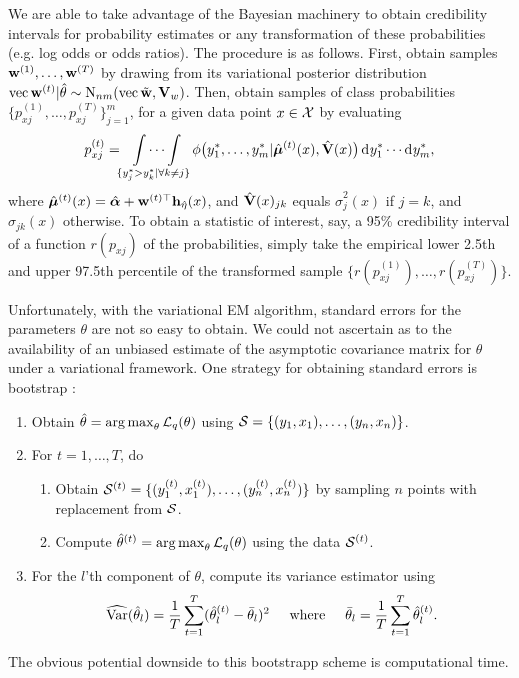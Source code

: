 We are able to take advantage of the Bayesian machinery to obtain credibility intervals for probability estimates or any transformation of these probabilities (e.g. log odds or odds ratios).
The procedure is as follows.
First, obtain samples ${\mathbf w}^{(1)},\dots,{\mathbf w}^{(T)}$ by drawing from its variational posterior distribution $\operatorname{vec}{\mathbf w}^{(t)}|\hat\theta \sim \operatorname{N}_{nm}(\operatorname{vec} \tilde{{\mathbf w}},{\mathbf V}_w)$.
Then, obtain samples of class probabilities $\{p_{xj}^{(1)},\dots, p_{xj}^{(T)} \}_{j=1}^m$, for a given data point $x\in{\mathcal X}$ by evaluating
\[
  p_{xj}^{(t)} = \idotsint\displaylimits_{\{y^*_j > y^*_k | \forall k \neq j \}} \phi\big(y_{1}^*, \dots, y_{m}^*|\hat{{\bm\mu}}^{(t)}(x), \hat{{\mathbf V}}(x)\big) \operatorname{d}\hspace{0.5pt}\! y_{1}^* \cdots \operatorname{d}\hspace{0.5pt}\! y_{m}^*,
\]
where $\hat{{\bm\mu}}^{(t)}(x) = \hat{{\bm\alpha}} + {\mathbf w}^{(t)\top}{\mathbf h}_{\hat\eta}(x)$, and $\hat{{\mathbf V}}(x)_{jk}$ equals $\hat\sigma^2_j(x)$ if $j = k$, and $\hat\sigma_{jk}(x)$ otherwise.
To obtain a statistic of interest, say, a 95\% credibility interval of a function $r(p_{xj})$ of the probabilities, simply take the empirical lower 2.5th and upper 97.5th percentile of the transformed sample $\big\{ r(p_{xj}^{(1)}),\dots, r(p_{xj}^{(T)}) \big\}$.

\begin{remark}
  Unfortunately, with the variational EM algorithm, standard errors for the parameters $\theta$ are not so easy to obtain.  
  We could not ascertain as to the availability of an unbiased estimate of the asymptotic covariance matrix for $\theta$ under a variational framework.
  One strategy for obtaining standard errors is bootstrap \citep{chen2017use}:
  \begin{enumerate}
    \item Obtain $\hat\theta = \operatorname*{arg\,max}_\theta {\mathcal L}_q(\theta)$ using ${\mathcal S} = \{(y_1,x_1),\dots, (y_n,x_n)\}$.
    \item For $t=1,\dots,T$, do
    \begin{enumerate}
      \item Obtain ${\mathcal S}^{(t)} = \{ (y_1^{(t)},x_1^{(t)}),\dots, (y_n^{(t)},x_n^{(t)})\}$ by sampling $n$ points with replacement from ${\mathcal S}$.
      \item Compute $\hat\theta^{(t)} = \operatorname*{arg\,max}_\theta {\mathcal L}_q(\theta)$ using the data ${\mathcal S}^{(t)}$.
    \end{enumerate}
    \item For the $l$'th component of $\theta$, compute its variance estimator using
    \[
      \widehat{\operatorname{Var}}(\hat\theta_l) = \frac{1}{T} \sum_{t=1}^T (\hat\theta_l^{(t)} - \bar\theta_l)^2
      \hspace{0.5cm}\text{where}\hspace{0.5cm}
      \bar\theta_l = \frac{1}{T} \sum_{t=1}^T \hat\theta_l^{(t)}.
    \]
  \end{enumerate}
  The obvious potential downside to this bootstrapp scheme is computational time.
\end{remark}

